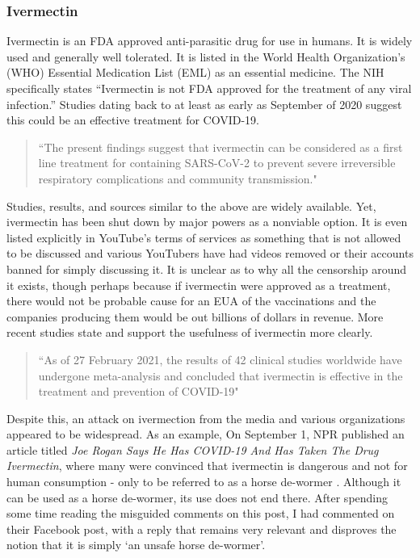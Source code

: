 \documentclass[10pt, a4paper, twocolumn]{book}
\begin{document}
\subsubsection{Ivermectin}

Ivermectin is an FDA approved anti-parasitic drug for use in humans. It is widely used and generally well tolerated. It is listed in the World Health Organization's (WHO) Essential Medication List (EML) as an essential medicine. The NIH specifically states ``Ivermectin is not FDA approved for the treatment of any viral infection.'' Studies dating back to at least as early as September of 2020 suggest this could be an effective treatment for COVID-19.
 
 \begin{quotation}
 	``The present findings suggest that ivermectin can be considered as a first line treatment for containing SARS-CoV-2 to prevent severe irreversible respiratory complications and community transmission." \citep{KhanMSIIvermectin}
 \end{quotation}

Studies, results, and sources similar to the above are widely available. Yet, ivermectin has been shut down by major powers as a nonviable option. It is even listed explicitly in YouTube's terms of services as something that is not allowed to be discussed and various YouTubers have had videos removed or their accounts banned for simply discussing it. It is unclear as to why all the censorship around it exists, though perhaps because if ivermectin were approved as a treatment, there would not be probable cause for an EUA of the vaccinations and the companies producing them would be out billions of dollars in revenue. More recent studies state and support the usefulness of ivermectin more clearly.

\begin{quotation}
	``As of 27 February 2021, the results of 42 clinical studies worldwide have undergone meta-analysis and concluded that ivermectin is effective in the treatment and prevention of COVID-19" \citep{IvermectinClinicalTrials}
\end{quotation}

Despite this, an attack on ivermection from the media and various organizations appeared to be widespread. As an example, On September 1, NPR published an article titled \textit{Joe Rogan Says He Has COVID-19 And Has Taken The Drug Ivermectin}, where many were convinced that ivermectin is dangerous and not for human consumption - only to be referred to as a horse de-wormer \citep{NPRIvermectinBashing}. Although it can be used as a horse de-wormer, its use does not end there. After spending some time reading the misguided comments on this post, I had commented on their Facebook post, with a reply that remains very relevant and disproves the notion that it is simply `an unsafe horse de-wormer'. 
\end{document}

